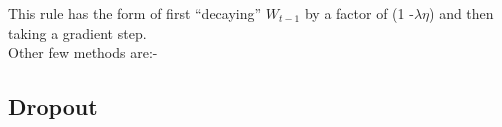 This rule has the form of first “decaying” $W_{t-1}$ by a factor of (1 -$\lambda \eta$) and then taking a gradient step.\\
Other few methods are:-




\subsection{Dropout}

